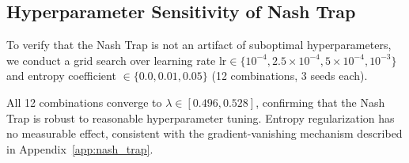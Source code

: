 \documentclass{article}
\begin{document}
\subsection{Hyperparameter Sensitivity of Nash Trap}
\label{app:hp_sweep}

To verify that the Nash Trap is not an artifact of suboptimal hyperparameters, we conduct a grid search over learning rate $\text{lr} \in \{10^{-4}, 2.5{\times}10^{-4}, 5{\times}10^{-4}, 10^{-3}\}$ and entropy coefficient $\in \{0.0, 0.01, 0.05\}$ (12 combinations, 3 seeds each).

\begin{table}[h]
\centering
\caption{Hyperparameter sweep: Nash Trap persists across all 12 lr$\times$entropy combinations (non-linear PGG, $N{=}20$, Byz=30\%, 150 episodes, 3 seeds).}
\label{tab:hp_sweep}
\end{table}

\noindent All 12 combinations converge to $\lambda \in [0.496, 0.528]$, confirming that the Nash Trap is robust to reasonable hyperparameter tuning.
Entropy regularization has no measurable effect, consistent with the gradient-vanishing mechanism described in Appendix~\ref{app:nash_trap}.
\end{document}
